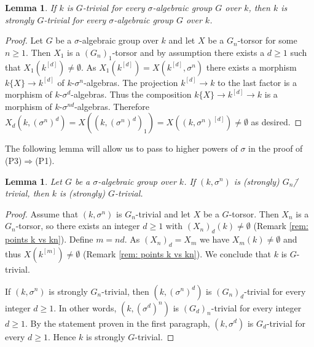 \documentclass[oneside,reqno]{amsart}
\newtheorem{lemma}[theo]{Lemma}
\theoremstyle{definition}
\newcommand{\s}{\sigma}
\newcommand{\poweak}{{\rm{(P1)}}}
\newcommand{\ptweak}{{\rm{(P3)}}}
\begin{document}
\begin{lemma}\label{lemma: trivial implies strongly trivial}
	If $k$ is $G$-trivial for every $\s$-algebraic group $G$ over $k$, then $k$ is strongly $G$-trivial for every $\s$-algebraic group $G$ over $k$.
\end{lemma}
\begin{proof}
	Let $G$ be a $\s$-algebraic group over $k$ and let $X$ be a $G_n$-torsor for some $n\geq 1$. Then $X_1$ is a $(G_n)_1$-torsor and by assumption there exists a $d\geq 1$ such that $X_1(k^{[d]})\neq\emptyset$. As $X_1(k^{[d]})=X(k^{[d]},\s^n)$ there exists a morphism $k\{X\}\to k^{[d]}$ of $k$-$\s^n$-algebras. The projection $k^{[d]}\to k$ to the last factor is a morphism of $k$-$\s^d$-algebras. Thus the composition $k\{X\}\to k^{[d]}\to k$ is a morphism of $k$-$\s^{nd}$-algebras. Therefore
	$X_d(k,(\s^n)^d)=X((k,(\s^n)^d)_1)=X((k,\s^n)^{[d]})\neq\emptyset$
	as desired.
\end{proof}	
The following lemma will allow us to pass to higher powers of $\s$ in the proof of \ptweak{}$\Rightarrow$\poweak{}.

\begin{lemma}\label{lem Gn trivial implies G trivial}
Let $G$ be a $\s$-algebraic group over $k$. If $(k,\s^n)$ is (strongly) $G_n$\=/trivial, then $k$ is (strongly) $G$-trivial.  
\end{lemma}

\begin{proof}
Assume that $(k,\s^n)$ is $G_n$-trivial and let $X$ be a $G$-torsor. Then $X_n$ is a $G_n$-torsor, so there exists an integer $d\geq 1$ with $(X_n)_d(k)\neq \emptyset$ (Remark \ref{rem: points k vs kn}). Define $m=nd$. As $(X_n)_d=X_m$ we have $X_m(k)\neq \emptyset$ and thus $X(k^{[m]})\neq \emptyset$ (Remark \ref{rem: points k vs kn}). We conclude that $k$ is $G$-trivial. 

If $(k,\s^n)$ is strongly $G_n$-trivial, then $(k,(\s^n)^d)$ is $(G_n)_d$-trivial for every integer $d\geq 1$. In other words, $(k,(\s^d)^n)$ is $(G_d)_n$-trivial for every integer $d\geq 1$.  By the statement proven in the first paragraph, $(k,\s^d)$ is $G_d$-trivial for every $d\geq 1$. Hence $k$ is strongly $G$-trivial.
\end{proof}


%
\end{document}
